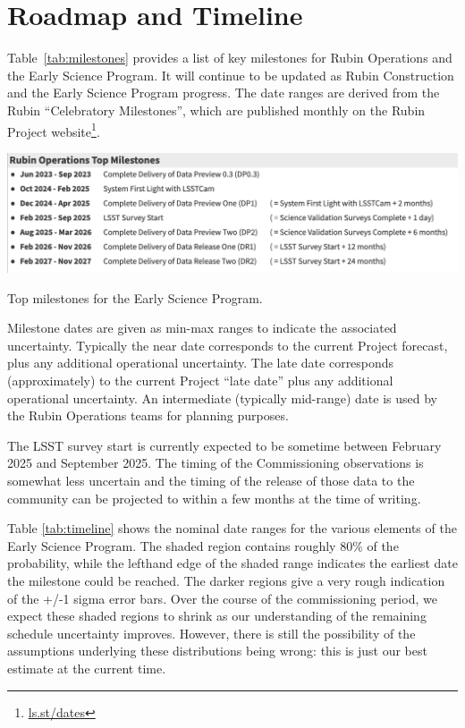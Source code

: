 \section{Roadmap and Timeline} \label{sec:timeline}

Table~\ref{tab:milestones} provides a list of key milestones for Rubin Operations and the Early Science Program.
It will continue to be updated as Rubin Construction and the Early Science Program progress. 
The date ranges are derived from the Rubin ``Celebratory Milestones'', which are  published monthly on the Rubin Project website\footnote{\url{ls.st/dates}}. 

\begin{table}[ht]
\centering
\includegraphics[width=\linewidth]{figures/DPR-milestones}
\caption{Top milestones for the Early Science Program.}
\label{tab:milestones}
\end{table}

Milestone dates are given as min-max ranges to indicate the associated uncertainty. 
Typically the near date corresponds to the current Project forecast, plus any additional operational uncertainty.
The late date corresponds (approximately) to the current Project ``late date'' plus any additional operational uncertainty.
An intermediate (typically mid-range) date is used by the Rubin Operations teams for planning purposes. 

The LSST survey start is currently expected to be sometime between February 2025 and September 2025.
The timing of the Commissioning observations is somewhat less uncertain and the timing of the release of those data to the community can be projected to within a few months at the time of writing.

Table \ref{tab:timeline} shows the nominal date ranges for the various elements of the Early Science Program. 
The shaded region contains roughly 80\% of the probability, while the lefthand edge of the shaded range indicates the earliest date the milestone could be reached. 
The darker regions give a very rough indication of the +/-1 sigma error bars. 
Over the course of the commissioning period, we expect these shaded regions to shrink as our understanding of the remaining schedule uncertainty improves. 
However, there is still the possibility of the assumptions underlying these distributions being wrong: this is just our best estimate at the current time.

